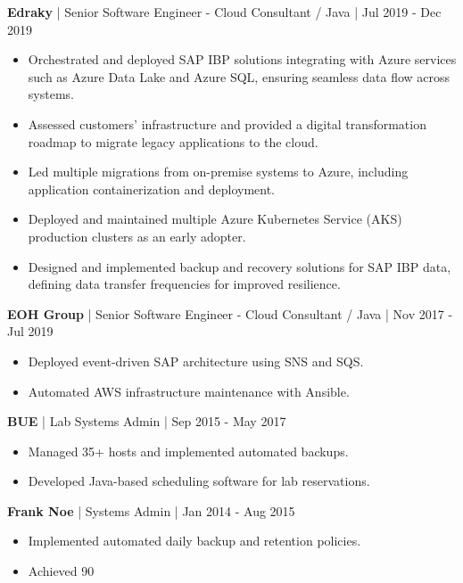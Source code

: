 \documentclass[a4paper,10pt]{article}
\begin{document}
\textbf{Edraky} | Senior Software Engineer - Cloud Consultant / Java | Jul 2019 - Dec 2019
\begin{itemize}
    \item Orchestrated and deployed SAP IBP solutions integrating with Azure services such as Azure Data Lake and Azure SQL, ensuring seamless data flow across systems.
    \item Assessed customers' infrastructure and provided a digital transformation roadmap to migrate legacy applications to the cloud.
    \item Led multiple migrations from on-premise systems to Azure, including application containerization and deployment.
    \item Deployed and maintained multiple Azure Kubernetes Service (AKS) production clusters as an early adopter.
    \item Designed and implemented backup and recovery solutions for SAP IBP data, defining data transfer frequencies for improved resilience.
\end{itemize}

\textbf{EOH Group} | Senior Software Engineer - Cloud Consultant / Java | Nov 2017 - Jul 2019
\begin{itemize}
    \item Deployed event-driven SAP architecture using SNS and SQS.
    \item Automated AWS infrastructure maintenance with Ansible.
\end{itemize}

\textbf{BUE} | Lab Systems Admin | Sep 2015 - May 2017
\begin{itemize}
    \item Managed 35+ hosts and implemented automated backups.
    \item Developed Java-based scheduling software for lab reservations.
\end{itemize}

\textbf{Frank Noe} | Systems Admin | Jan 2014 - Aug 2015
\begin{itemize}
    \item Implemented automated daily backup and retention policies.
    \item Achieved 90%
\end{itemize}
\end{document}
